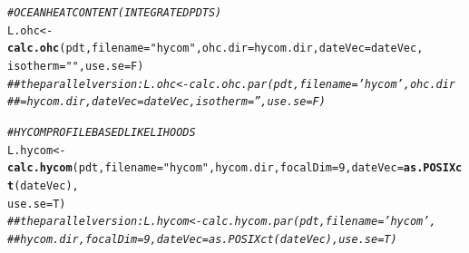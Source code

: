 \documentclass{article}\usepackage[]{graphicx}\usepackage[]{color}
\makeatletter
\newcommand{\hlnum}[1]{\textcolor[rgb]{0.686,0.059,0.569}{#1}}%
\newcommand{\hlstr}[1]{\textcolor[rgb]{0.192,0.494,0.8}{#1}}%
\newcommand{\hlcom}[1]{\textcolor[rgb]{0.678,0.584,0.686}{\textit{#1}}}%
\newcommand{\hlstd}[1]{\textcolor[rgb]{0.345,0.345,0.345}{#1}}%
\newcommand{\hlkwb}[1]{\textcolor[rgb]{0.69,0.353,0.396}{#1}}%
\newcommand{\hlkwc}[1]{\textcolor[rgb]{0.333,0.667,0.333}{#1}}%
\newcommand{\hlkwd}[1]{\textcolor[rgb]{0.737,0.353,0.396}{\textbf{#1}}}%
\newenvironment{kframe}{%
 \def\at@end@of@kframe{}%
 \ifinner\ifhmode%
  \def\at@end@of@kframe{\end{minipage}}%
  \begin{minipage}{\columnwidth}%
 \fi\fi%
 \def\FrameCommand##1{\hskip\@totalleftmargin \hskip-\fboxsep
 \colorbox{shadecolor}{##1}\hskip-\fboxsep
     \hskip-\linewidth \hskip-\@totalleftmargin \hskip\columnwidth}%
 \MakeFramed {\advance\hsize-\width
   \@totalleftmargin\z@ \linewidth\hsize
   \@setminipage}}%
 {\par\unskip\endMakeFramed%
 \at@end@of@kframe}
\newenvironment{knitrout}{}{} %
\makeatother
\begin{document}
\begin{knitrout}\small
{}\color{fgcolor}\begin{kframe}
\begin{alltt}
\hlcom{# OCEAN HEAT CONTENT (INTEGRATED PDTS)}
\hlstd{L.ohc} \hlkwb{<-} \hlkwd{calc.ohc}\hlstd{(pdt,} \hlkwc{filename} \hlstd{=} \hlstr{"hycom"}\hlstd{,} \hlkwc{ohc.dir} \hlstd{= hycom.dir,} \hlkwc{dateVec} \hlstd{= dateVec,}
    \hlkwc{isotherm} \hlstd{=} \hlstr{""}\hlstd{,} \hlkwc{use.se} \hlstd{= F)}
\hlcom{## the parallel version: L.ohc <- calc.ohc.par(pdt, filename='hycom', ohc.dir}
\hlcom{## = hycom.dir, dateVec = dateVec, isotherm = '', use.se = F)}

\hlcom{# HYCOM PROFILE BASED LIKELIHOODS}
\hlstd{L.hycom} \hlkwb{<-} \hlkwd{calc.hycom}\hlstd{(pdt,} \hlkwc{filename} \hlstd{=} \hlstr{"hycom"}\hlstd{, hycom.dir,} \hlkwc{focalDim} \hlstd{=} \hlnum{9}\hlstd{,} \hlkwc{dateVec} \hlstd{=} \hlkwd{as.POSIXct}\hlstd{(dateVec),}
    \hlkwc{use.se} \hlstd{= T)}
\hlcom{## the parallel version: L.hycom <- calc.hycom.par(pdt, filename='hycom',}
\hlcom{## hycom.dir, focalDim = 9, dateVec = as.POSIXct(dateVec), use.se = T)}
\end{alltt}
\end{kframe}
\end{knitrout}
\end{document}
